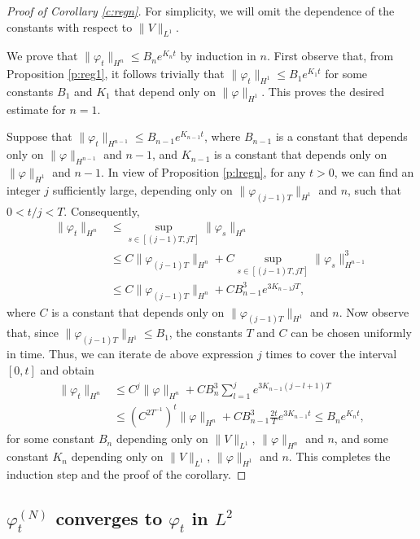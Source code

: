 \documentclass[11pt,a4paper,draft,DIV11]{scrartcl}	%
\newcommand{\ph}{\varphi_t^{(N)}}	%
\begin{document}
\begin{proof}[Proof of Corollary \ref{c:regn}]
  For simplicity, we will omit the dependence of the constants with respect to
  $\| V \|_{L^1}$.

  We prove that $\| \varphi_t \|_{H^n} \le B_n e^{K_n t}$ by induction in
  $n$. First observe that, from Proposition \ref{p:reg1}, it follows trivially that
  $\| \varphi_t \|_{H^1} \le B_1 e^{K_1 t}$ for some constants $B_1$ and $K_1$
  that depend only on $\| \varphi \|_{H^1}$. This proves the desired estimate
  for $n=1$.


  Suppose that $\| \varphi_t \|_{H^{n-1}} \le B_{n-1} e^{K_{n-1} t}$, where
  $B_{n-1}$ is a constant that depends only on $\| \varphi \|_{H^{n-1}}$ and
  $n-1$, and $K_{n-1}$ is a constant that depends only on $\| \varphi
  \|_{H^1}$ and $n-1$. In view of Proposition \ref{p:lregn}, for any $t > 0$,
  we can find an integer $j$ sufficiently large, depending only on $\|
  \varphi_{(j-1)T} \|_{H^1}$ and $n$, such that $0 < t/j < T$.
  Consequently,
  \begin{align*}
    \| \varphi_t \|_{H^n} & \le \sup_{s \in [(j-1)T, jT]} \| \varphi_s
    \|_{H^n} \\
    & \le C \| \varphi_{(j-1)T} \|_{H^n} + C \sup_{s \in [(j-1)T,
    jT]} \| \varphi_s \|_{H^{n-1}}^3 \\
    & \le C \| \varphi_{(j-1)T} \|_{H^n} + C B_{n-1}^3 e^{3 K_{n-1} j
    T},
  \end{align*}
  where $C$ is a constant that depends only on $\| \varphi_{(j-1)T}
  \|_{H^1}$ and $n$. Now observe that, since $\| \varphi_{(j-1)T} \|_{H^1}
  \le B_1$, the constants $T$ and $C$ can be chosen uniformly in time. Thus,
  we can iterate de above expression $j$ times to cover the interval $[0,t]$
  and obtain
  \begin{align*}
    \| \varphi_t \|_{H^n} & \le C^j \| \varphi \|_{H^n} + C B_n^3
    \sum_{l=1}^j e^{3 K_{n-1} (j-l+1)T} \\
    & \le (C^{2T^{-1}})^t \| \varphi \|_{H^n} + C B_{n-1}^3
    \frac{2t}{T} e^{3 K_{n-1} t} \le B_n e^{K_n t},
  \end{align*}
  for some constant $B_n$ depending only on $\| V \|_{L^1}$, $\| \varphi
  \|_{H^n}$ and $n$, and some constant $K_n$ depending only on $\| V
  \|_{L^1}$, $\| \varphi \|_{H^1}$ and $n$. This completes the induction step
  and the proof of the corollary.
\end{proof}


\subsection{$\ph$ converges to $\varphi_t$ in $L^2$}
\end{document}
